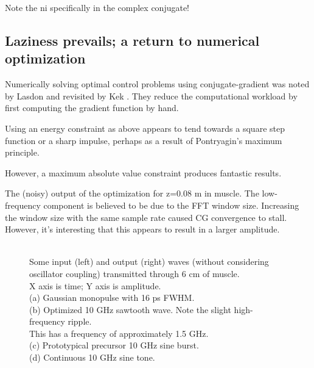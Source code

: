 \documentclass[paper.tex]{subfiles}
\begin{document}
Note the ni specifically in the complex conjugate!


\subsection{Laziness prevails; a return to numerical optimization}

Numerically solving optimal control problems using conjugate-gradient was noted by Lasdon \cite{conjugate1967} and 
revisited by Kek \cite{Conjugate}. They reduce the computational workload by first computing the 
gradient function by hand.

Using an energy constraint as above appears to tend towards a square step function or a sharp impulse, perhaps as a result of Pontryagin's maximum principle\cite{Optimum1964}.


However, a maximum absolute value constraint produces fantastic results.


\begin{figure}[H]
	
	\caption{}
\end{figure}


The (noisy) output of the optimization for z=0.08 m in muscle. The low-frequency component is believed to be due to the FFT window size. Increasing the window size with the same sample rate caused CG convergence to stall. However, it's interesting that this appears to result in a larger amplitude. 


\begin{figure}[H]
	
	\caption{}
\end{figure}


\begin{figure}[H]
	
	\caption{\\
		Some input (left) and output (right) waves (without considering oscillator coupling) transmitted through 6 cm of muscle.\\
		X axis is time; Y axis is amplitude.\\
		(a) Gaussian monopulse with 16 ps FWHM.\\
		(b) Optimized 10 GHz sawtooth wave. Note the slight high-frequency ripple.\\ This has a frequency of approximately 1.5 GHz.\\
		(c) Prototypical precursor 10 GHz sine burst.\\
		(d) Continuous 10 GHz sine tone.
}
\end{figure}
\end{document}

